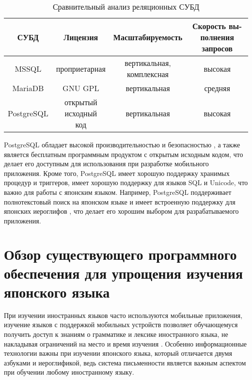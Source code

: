 \begin{table}[ht]
  \caption{Сравнительный анализ реляционных СУБД}
  \label{tab:rel-dbms}
  \begin{center}
    \begin{tabular}{|c|c|c|c|}
      \hline
      СУБД & Лицензия & Масштабируемость & \makecell{Скорость вы- \\ полнения запросов} \\
      \hline
      \hline
      MSSQL \cite{mssql} & проприетарная & \makecell{вертикальная, \\ комплексная} & высокая \\
      \hline
      MariaDB \cite{mariadb} & GNU GPL & вертикальная & средняя \\
      \hline
      PostgreSQL \cite{postgresql} & \makecell{открытый \\ исходный \\ код} & вертикальная & высокая  \\
      \hline
    \end{tabular}
  \end{center}
\end{table}

PostgreSQL обладает высокой производительностью и безопасностью \cite{relational-dbms},
а также является бесплатным программным продуктом с открытым
исходным кодом, что делает его доступным для использования при
разработке мобильного приложения. Кроме того, PostgreSQL имеет
хорошую поддержку хранимых процедур и триггеров, имеет хорошую
поддержку для языков SQL и Unicode, что важно для 
работы с японским языком. Например, PostgreSQL поддерживает 
полнотекстовый поиск на японском языке и имеет встроенную 
поддержку для японских иероглифов \cite{postgresql}, что делает его
хорошим выбором для разрабатываемого приложения.

\section{Обзор существующего программного обеспечения для упрощения изучения японского языка}

При изучении иностранных языков часто используются
мобильные приложения, изучение языков с поддержкой мобильных устройств
позволяет обучающемуся получить доступ к знаниям о грамматике и
лексике иностранного языка, не накладывая ограничений на место
и время изучения \cite{mobapps-ll}. Особенно информационные технологии
важны при изучении японского языка, который отличается двумя
азбуками и иероглификой, ведь система письменности является важным
аспектом при обучении любому иностранному языку.

